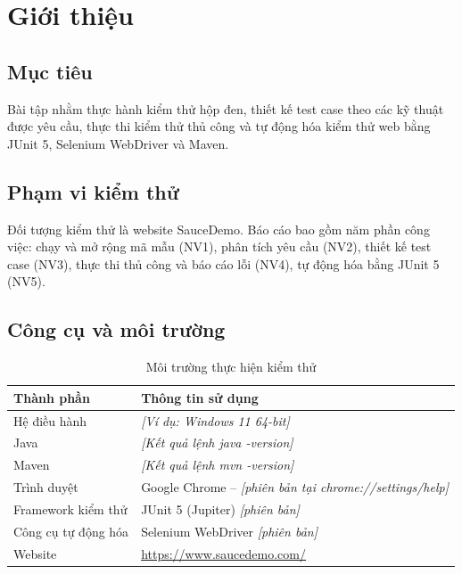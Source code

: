\documentclass[a4paper,12pt]{article}
\newcommand{\fillin}[1]{\textit{[#1]}}
\begin{document}
\tableofcontents
\newpage
{}
\setcounter{page}{1}

\section{Giới thiệu}

\subsection{Mục tiêu}
Bài tập nhằm thực hành kiểm thử hộp đen, thiết kế test case theo các kỹ thuật được yêu cầu, thực thi kiểm thử thủ công và tự động hóa kiểm thử web bằng JUnit 5, Selenium WebDriver và Maven.

\subsection{Phạm vi kiểm thử}
Đối tượng kiểm thử là website SauceDemo. Báo cáo bao gồm năm phần công việc: chạy và mở rộng mã mẫu (NV1), phân tích yêu cầu (NV2), thiết kế test case (NV3), thực thi thủ công và báo cáo lỗi (NV4), tự động hóa bằng JUnit 5 (NV5).

\subsection{Công cụ và môi trường}
\begin{table}[htbp]
\centering
\caption{Môi trường thực hiện kiểm thử}
\begin{tabularx}{\textwidth}{|p{4cm}|X|}
\hline
\textbf{Thành phần} & \textbf{Thông tin sử dụng} \\
\hline
Hệ điều hành & \fillin{Ví dụ: Windows 11 64-bit} \\
\hline
Java & \fillin{Kết quả lệnh java -version} \\
\hline
Maven & \fillin{Kết quả lệnh mvn -version} \\
\hline
Trình duyệt & Google Chrome -- \fillin{phiên bản tại chrome://settings/help} \\
\hline
Framework kiểm thử & JUnit 5 (Jupiter) \fillin{phiên bản} \\
\hline
Công cụ tự động hóa & Selenium WebDriver \fillin{phiên bản} \\
\hline
Website & \url{https://www.saucedemo.com/} \\
\hline
\end{tabularx}
\end{table}
\end{document}
